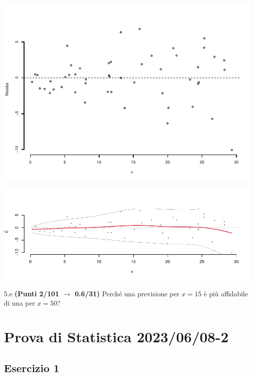 \documentclass[
  11pt,
]{book}
\theoremstyle{mytheoremstyle}
\theoremstyle{mydefstyle}
\newenvironment{sol}
  {
  \begin{tcolorbox}[enhanced,breakable,arc=0.1mm,boxrule=1pt,colback=white,colframe=iblue,
  title=\bf \fontfamily{lmss}\selectfont \hspace{.5 cm} Soluzione,drop fuzzy shadow]

}{
\end{tcolorbox}
  }
\begin{document}
\begin{center}\includegraphics{Esami_passati_con_soluzioni_files/figure-latex/2023-39,-1} \end{center}

\begin{sol}

\begin{center}\includegraphics{Esami_passati_con_soluzioni_files/figure-latex/2023-40,-1} \end{center}

\end{sol}

5.e \textbf{(Punti 2/101 \(\rightarrow\) 0.6/31)} Perché una previsione per \(x=15\) è più affidabile di una per \(x=50\)?

\section{Prova di Statistica 2023/06/08-2}\label{prova-di-statistica-20230608-2}

\subsection{Esercizio 1}\label{esercizio-1-26}
\end{document}
